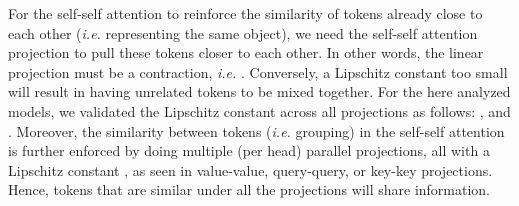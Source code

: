 \documentclass[10pt,twocolumn,letterpaper]{article}
\begin{document}
For the self-self attention to reinforce the similarity of tokens already close to each other (\textit{i.e.} representing the same object), we need the self-self attention projection to pull these tokens closer to each other. In other words, the linear projection must be a contraction, \textit{i.e.} . Conversely, a Lipschitz constant too small will result in having unrelated tokens to be mixed together. For the here analyzed models, we validated the Lipschitz constant across all projections as follows: ,  and .  
Moreover, the similarity between tokens (\textit{i.e.} grouping) in the self-self attention is further enforced by doing multiple (per head) parallel projections, all with a Lipschitz constant , as seen in value-value, query-query, or key-key projections.
Hence, tokens that are similar under all the projections will share information.
\end{document}
